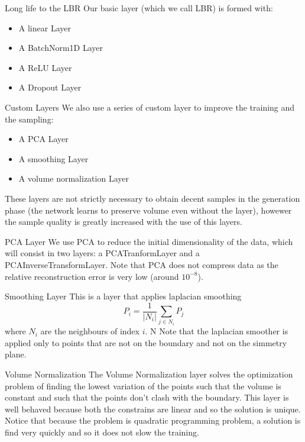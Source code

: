 \documentclass{beamer}
\begin{document}
\begin{frame}{Long life to the LBR}
Our basic layer (which we call LBR) is formed with:
\begin{itemize}
\item A linear Layer
\item A BatchNorm1D Layer
\item A ReLU Layer
\item A Dropout Layer
\end{itemize}
\end{frame}
\begin{frame}{Custom Layers}
We also use a series of custom layer to improve the training and the sampling:
\begin{itemize}
\item A PCA Layer
\item A smoothing Layer
\item A volume normalization Layer
\end{itemize}
These layers are not strictly necessary to obtain decent samples in the generation phase (the network learns to preserve volume even without the layer), howewer the sample quality is greatly increased with the use of this layers.
\end{frame}
\begin{frame}{PCA Layer}
We use PCA to reduce the initial dimensionality of the data, which will consist in two layers: a PCATranformLayer and a PCAInverseTransformLayer. Note that PCA does not compress data as the relative reconstruction error is very low (around $10^{-8}$).
\end{frame}
\begin{frame}{Smoothing Layer}
This is a layer that applies laplacian smoothing $$P_{i}=\frac{1}{|N_{i}|}\sum_{j \in N_{i}} P_{j}$$ where $N_{i}$ are the neighbours of index $i$. N Note that the laplacian smoother is applied only to points that are not on the boundary and not on the simmetry plane. 
\end{frame}
\begin{frame}{Volume Normalization}
The Volume Normalization layer solves the optimization problem of finding the lowest variation of the points such that the volume is constant and such that the points don't clash with the boundary. This layer is well behaved because both the constrains are linear and so the solution is unique. Notice that because the problem is quadratic programming problem, a solution is find very quickly and so it does not slow the training.
\end{frame}
\end{document}

